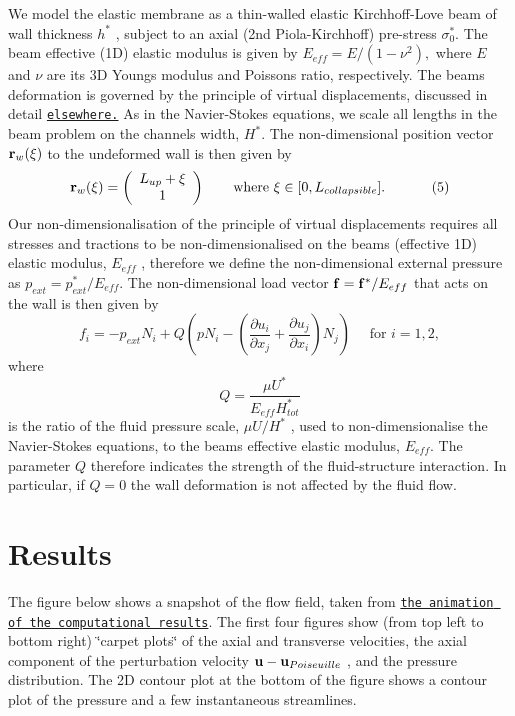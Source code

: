 \begin{center}
\begin{longtabu}
We model the elastic membrane as a thin-\/walled elastic Kirchhoff-\/\+Love beam of wall thickness $ h^* $ , subject to an axial (2nd Piola-\/\+Kirchhoff) pre-\/stress $ \sigma^*_0. $ The beam\textquotesingle{} effective (1D) elastic modulus is given by $ E_{eff} = E/(1-\nu^2), $ where $ E $ and $ \nu $ are its 3D Young\textquotesingle{}s modulus and Poisson\textquotesingle{}s ratio, respectively. The beam\textquotesingle{}s deformation is governed by the principle of virtual displacements, discussed in detail \href{../../../beam/tensioned_string/html/index.html}{\tt elsewhere.} As in the Navier-\/\+Stokes equations, we scale all lengths in the beam problem on the channel\textquotesingle{}s width, $ H^*. $ The non-\/dimensional position vector $ {\bf r}_w(\xi) $ to the undeformed wall is then given by \[ {\bf r}_w(\xi) = \left( \begin{array}{c} L_{up} + \xi \\ 1 \end{array} \right) \ \ \ \ \ \ \mbox{where $\xi \in [0,L_{collapsible}].$} \ \ \ \ \ \ \ \ \ \ (5) \] Our non-\/dimensionalisation of the principle of virtual displacements requires all stresses and tractions to be non-\/dimensionalised on the beam\textquotesingle{}s (effective 1D) elastic modulus, $ E_{eff} $ , therefore we define the non-\/dimensional external pressure as $ p_{ext} = p_{ext}^{*}/E_{eff}. $ The non-\/dimensional load vector $ {\bf f} = {\bf f}^{*}/E_{eff} $ that acts on the wall is then given by \[ f_i = - p_{ext} N_i + Q \left( p N_i - \left( \frac{\partial u_i}{\partial x_j} + \frac{\partial u_j}{\partial x_i} \right) N_j \right) \ \ \ \ \ \ \mbox{for $i=1,2,$} \] where \[ Q = \frac{\mu U^*}{E_{eff} H^*_{tot}} \] is the ratio of the fluid pressure scale, $ \mu U/H^* $ , used to non-\/dimensionalise the Navier-\/\+Stokes equations, to the beam\textquotesingle{}s effective elastic modulus, $ E_{eff} $. The parameter $ Q $ therefore indicates the strength of the fluid-\/structure interaction. In particular, if $ Q=0 $ the wall deformation is not affected by the fluid flow.   \\
\end{longtabu}
\end{center} 



 

\hypertarget{index_reslt}{}\section{Results}\label{index_reslt}
The figure below shows a snapshot of the flow field, taken from \href{../figures/fsi_taylor_hood_flow8.avi}{\tt the animation of the computational results}. The first four figures show (from top left to bottom right) \char`\"{}carpet plots\char`\"{} of the axial and transverse velocities, the axial component of the perturbation velocity $ {\bf u} - {\bf u}_{Poiseuille} $ , and the pressure distribution. The 2D contour plot at the bottom of the figure shows a contour plot of the pressure and a few instantaneous streamlines.

